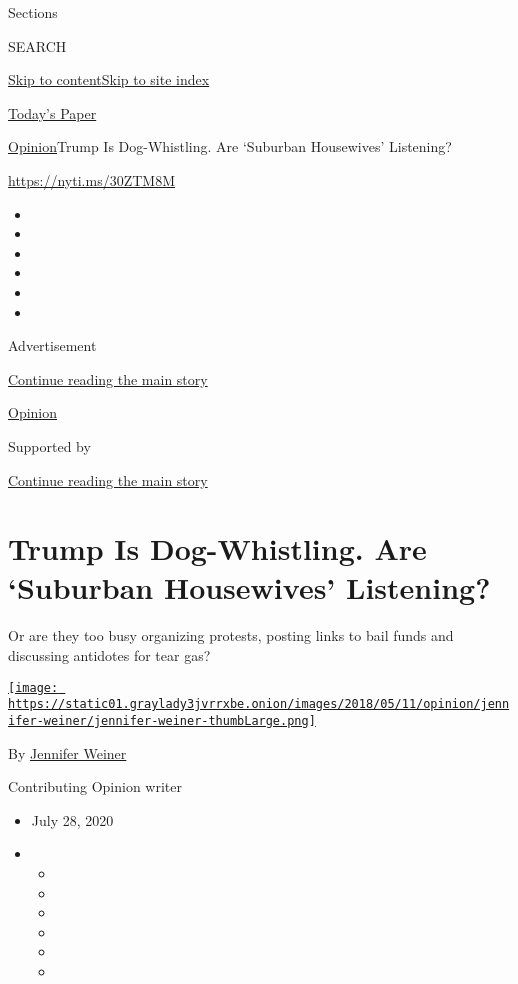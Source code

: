 Sections

SEARCH

\protect\hyperlink{site-content}{Skip to
content}\protect\hyperlink{site-index}{Skip to site index}

\href{https://myaccount.nytimes3xbfgragh.onion/auth/login?response_type=cookie\&client_id=vi}{}

\href{https://www.nytimes3xbfgragh.onion/section/todayspaper}{Today's
Paper}

\href{/section/opinion}{Opinion}\textbar{}Trump Is Dog-Whistling. Are
`Suburban Housewives' Listening?

\url{https://nyti.ms/30ZTM8M}

\begin{itemize}
\item
\item
\item
\item
\item
\item
\end{itemize}

Advertisement

\protect\hyperlink{after-top}{Continue reading the main story}

\href{/section/opinion}{Opinion}

Supported by

\protect\hyperlink{after-sponsor}{Continue reading the main story}

\hypertarget{trump-is-dog-whistling-are-suburban-housewives-listening}{%
\section{Trump Is Dog-Whistling. Are `Suburban Housewives'
Listening?}\label{trump-is-dog-whistling-are-suburban-housewives-listening}}

Or are they too busy organizing protests, posting links to bail funds
and discussing antidotes for tear gas?

\href{https://www.nytimes3xbfgragh.onion/by/jennifer-weiner}{\texttt{[image: https://static01.graylady3jvrrxbe.onion/images/2018/05/11/opinion/jennifer-weiner/jennifer-weiner-thumbLarge.png]}}

By \href{https://www.nytimes3xbfgragh.onion/by/jennifer-weiner}{Jennifer
Weiner}

Contributing Opinion writer

\begin{itemize}
\item
  July 28, 2020
\item
  \begin{itemize}
  \item
  \item
  \item
  \item
  \item
  \item
  \end{itemize}
\end{itemize}

